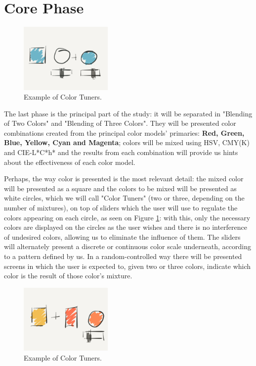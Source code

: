 \documentclass{report}
\begin{document}
\section{Core Phase}
%
\begin{figure}
	\centering
    \vspace{-\baselineskip}
    \includegraphics[width=0.4\textwidth]{Prop1.PNG}
    \caption[Color Tuners with Blue Color]{Example of Color Tuners.}
    \label{fig:tuners1}
\end{figure}
%
The last phase is the principal part of the study: it will be separated in "Blending of Two Colors" and "Blending of Three Colors". They will be presented
color combinations created from the principal color models' primaries: \textbf{Red, Green, Blue, Yellow, Cyan and Magenta}; colors will be mixed
using HSV, CMY(K) and CIE-L*C*h* and the results from each combination will provide us hints about the effectiveness of each color model. \par
Perhaps, the way color is presented is the most relevant detail: the mixed color will be presented as a square and the colors to be mixed will be presented as white
circles, which we will call "Color Tuners" (two or three, depending on the number of mixtures), on top of sliders which the user will use to regulate
the colors appearing on each circle, as seen on Figure \ref{fig:tuners1}: with this, only the necessary colors are displayed on the circles as the user wishes and there is no interference
of undesired colors, allowing us to eliminate the influence of them. The sliders will alternately present a discrete or continuous color scale underneath, according to a pattern defined by us. In a random-controlled way there will be presented
screens in which the user is expected to, given two or three colors, indicate
which color is the result of those color's mixture. \par
%
\begin{figure}
	\centering
    \vspace{-\baselineskip}
    \includegraphics[width=0.4\textwidth]{Prop2.png}
    \caption[Color Tuners Expectation]{Example of Color Tuners.}
    \label{fig:tuners2}
\end{figure}
\end{document}
